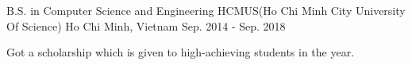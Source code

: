 

\begin{cventries}

  \cventry
    {B.S. in Computer Science and Engineering} %
    {HCMUS(Ho Chi Minh City University Of Science)} %
    {Ho Chi Minh, Vietnam} %
    {Sep. 2014 - Sep. 2018} %
    {
      \begin{cvitems} %
        \item {Got a scholarship which is given to high-achieving students in the year.}
      \end{cvitems}
    }

\end{cventries}
